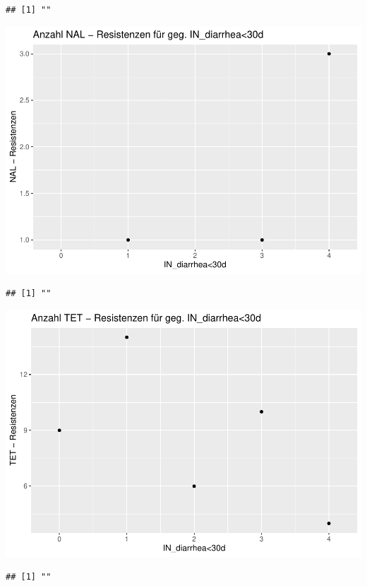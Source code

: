 \documentclass[
]{article}
\begin{document}
\begin{verbatim}
## [1] ""
\end{verbatim}

\includegraphics{NResistenzen_files/figure-latex/unnamed-chunk-6-37.pdf}

\begin{verbatim}
## [1] ""
\end{verbatim}

\includegraphics{NResistenzen_files/figure-latex/unnamed-chunk-6-38.pdf}

\begin{verbatim}
## [1] ""
\end{verbatim}
\end{document}
